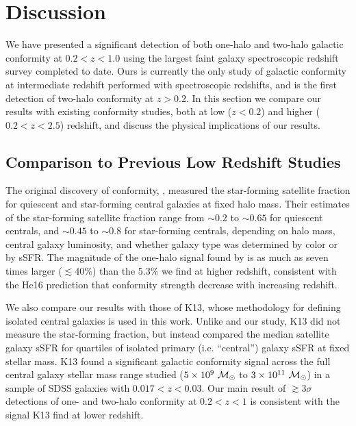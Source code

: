 
\section{Discussion}\label{sec:discussion}

We have presented a significant detection of both one-halo and two-halo galactic conformity 
at ${0.2 < z < 1.0}$ using the largest faint galaxy spectroscopic redshift survey completed to date.  
Ours is currently the only study of galactic conformity at intermediate redshift performed with 
spectroscopic redshifts, and is the first detection of two-halo conformity at $z>0.2$.
In this section we compare our results with existing conformity studies,
both at low ($z<0.2$) and higher (${0.2<z<2.5}$) redshift,
and discuss the physical implications of our results.



\subsection{Comparison to Previous Low Redshift Studies}\label{sec:compare_low}


The original discovery of conformity, \citet{Weinmann06}, measured the star-forming satellite fraction for quiescent and
star-forming central galaxies at fixed halo mass.
Their estimates of the star-forming satellite fraction range from $\sim0.2$ to $\sim0.65$ for quiescent centrals, and $\sim0.45$ to $\sim0.8$ for star-forming
centrals, depending on halo mass, central galaxy luminosity, and whether galaxy type was determined by color or by sSFR.
The magnitude of the one-halo signal found by \citet{Weinmann06} is as much as seven times larger ($\lesssim40$\%) than the 5.3\% 
we find at higher redshift, consistent with the He16 prediction that conformity strength decrease with increasing redshift.

We also compare our results with those of K13, whose methodology for defining isolated central galaxies is used in this work.
Unlike \citet{Weinmann06} and our study, K13 did not measure the star-forming fraction, but instead 
compared the median satellite galaxy sSFR for quartiles of isolated primary (i.e. ``central'') galaxy sSFR at fixed stellar mass.
K13 found a significant galactic conformity signal across the full central 
galaxy stellar mass range studied (${5\times10^9~\msun}$ to ${3\times10^{11}~\msun}$) in a sample of 
SDSS galaxies with ${0.017 < z < 0.03}$.
Our main result of $\gtrsim3\sigma$ detections of one- and two-halo conformity at ${0.2<z<1}$ is consistent with the signal K13 find at lower redshift.

